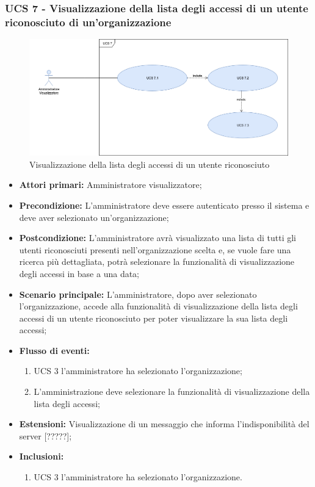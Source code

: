 \subsubsection{UCS 7 - Visualizzazione della lista degli accessi di un utente riconosciuto di un'organizzazione}

\begin{figure}[h]
	\centering
	\includegraphics[scale=0.3]{sezioni/UseCase/Immagini/UCS7.png}
	\caption{Visualizzazione della lista degli accessi di un utente riconosciuto}
\end{figure}

\begin{itemize}
\item \textbf{Attori primari:} Amministratore visualizzatore;
\item \textbf{Precondizione:} L’amministratore deve essere autenticato presso il sistema e deve aver selezionato un'organizzazione;
\item \textbf{Postcondizione:} L’amministratore avrà visualizzato una lista di tutti gli utenti riconosciuti presenti nell'organizzazione scelta e, se vuole fare una ricerca più dettagliata, potrà selezionare la funzionalità di visualizzazione degli accessi in base a una data;
\item \textbf{Scenario principale:} L’amministratore, dopo aver selezionato l'organizzazione, accede alla funzionalità di visualizzazione della lista degli accessi di un utente riconosciuto per poter visualizzare la sua lista degli accessi;
\item \textbf{Flusso di eventi:} 
\begin{enumerate}
	\item UCS 3 l'amministratore ha selezionato l'organizzazione;
	\item L'amministrazione deve selezionare la funzionalità di visualizzazione della lista degli accessi;
\end{enumerate}
\item \textbf{Estensioni:} Visualizzazione di un messaggio che informa l’indisponibilità del server [?????];
\item \textbf{Inclusioni:}
\begin{enumerate}
	\item UCS 3 l'amministratore ha selezionato l'organizzazione.
\end{enumerate}
\end{itemize}

